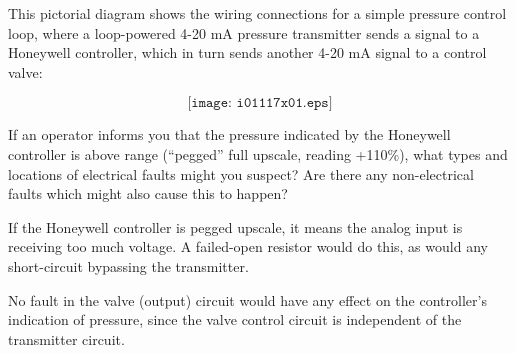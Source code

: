 

This pictorial diagram shows the wiring connections for a simple pressure control loop, where a loop-powered 4-20 mA pressure transmitter sends a signal to a Honeywell controller, which in turn sends another 4-20 mA signal to a control valve:

$$\texttt{[image: i01117x01.eps]}$$

If an operator informs you that the pressure indicated by the Honeywell controller is above range (``pegged'' full upscale, reading +110\%), what types and locations of electrical faults might you suspect?  Are there any non-electrical faults which might also cause this to happen?








If the Honeywell controller is pegged upscale, it means the analog input is receiving too much voltage.  A failed-open resistor would do this, as would any short-circuit bypassing the transmitter.
 
\vskip 10pt

No fault in the valve (output) circuit would have any effect on the controller's indication of pressure, since the valve control circuit is independent of the transmitter circuit.











